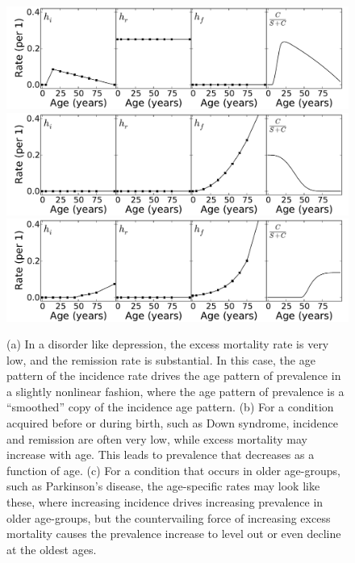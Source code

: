 \begin{figure}
\begin{center}
\includegraphics[width=\textwidth]{forward-sim-mental.pdf}
\includegraphics[width=\textwidth]{forward-sim-congenital.pdf}
\includegraphics[width=\textwidth]{forward-sim-old_age.pdf}
\caption{ (a) In a disorder like depression, the excess mortality rate is
  very low, and the remission rate is substantial.  In this case, the
  age pattern of the incidence rate drives the age pattern of
  prevalence in a slightly nonlinear fashion, where the age pattern
  of prevalence is a ``smoothed'' copy of the incidence age pattern.
(b) For a condition acquired before or during birth, such as
  Down syndrome, incidence and remission are often very low, while
  excess mortality may increase with age.  This leads to prevalence
  that decreases as a function of age.
(c) For a condition that occurs in older age-groups, such as
  Parkinson's disease, the age-specific rates may look like these,
  where increasing incidence drives increasing prevalence in older
  age-groups, but the countervailing force of increasing excess mortality
  causes the prevalence increase to level out or even decline at the
  oldest ages.
}
\label{forward-sim-ex3}
\end{center}
\end{figure}

